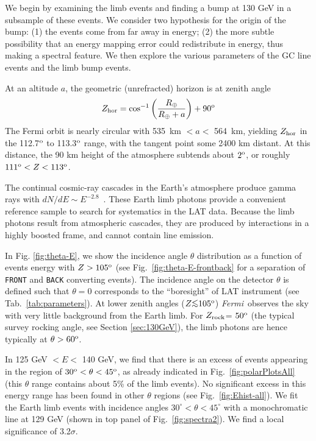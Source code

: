 \documentclass[aps,twocolumn,prd,superscriptaddress,showpacs,nofootinbib,fixfloat]{revtex4}
\newcommand{\be}{\begin{equation}}
\newcommand{\ee}{\end{equation}}
\newcommand{\Fermi}{{\slshape Fermi}}
\newcommand{\degree}{^{\rm o}}
\newcommand{\zrock}{$Z_{\rm rock}$}
\def\la{\vcenter{\hbox{$<$}\offinterlineskip\hbox{$\sim$}}}
\newcommand\Refsec[1]{Section \ref{sec:#1}}
\begin{document}
We begin by examining the limb events and finding a bump at
130 GeV in a subsample of these events.  We consider two
hypothesis for the origin of the bump: (1) the events come
from far away in energy; (2) the more subtle possibility
that an energy mapping error could redistribute in energy,
thus making a spectral feature. We then explore the various
parameters of the GC line events and the limb bump events.

At an altitude $a$, the geometric (unrefracted) horizon is
at zenith angle \be Z_{\rm hor} =
\cos^{-1}\left(\frac{R_\oplus}{R_\oplus+a}\right)+90\degree
\ee The Fermi orbit is nearly circular with 535~km $< a <$
564~km, yielding $Z_{\rm hor}$ in the 112.7$\degree$ to
113.3$\degree$ range, with the tangent point some 2400 km
distant.  At this distance, the 90 km height of the
atmosphere subtends about $2\degree$, or roughly $111\degree
< Z < 113\degree$.

The continual cosmic-ray cascades in the Earth's atmosphere
produce gamma rays with $dN/dE \sim
E^{-2.8}$~\citep{FermiLimb}. These Earth limb photons
provide a convenient reference sample to search for
systematics in the LAT data.  Because the limb photons
result from atmospheric cascades, they are produced by
interactions in a highly boosted frame, and cannot contain
line emission.  

In Fig. \ref{fig:theta-E}, we show the incidence angle
$\theta$ distribution as a function of events energy with $Z
> 105\degree$ (see Fig.~\ref{fig:theta-E-frontback} for a
separation of \texttt{FRONT} and \texttt{BACK} converting
events).  The incidence angle on the detector $\theta$ is
defined such that $\theta=0$ corresponds to the
``boresight'' of LAT instrument (see
Tab.~\ref{tab:parameters}).  At lower zenith angles ($Z \la
105\degree$) \Fermi\ observes the sky with very little
background from the Earth limb.  For \zrock = $50\degree$
(the typical survey rocking angle, see \Refsec{130GeV}), the
limb photons are hence typically at $\theta > 60\degree$.

In 125 GeV $< E <$ 140 GeV, we find that there is an excess
of events appearing in the region of $30\degree < \theta <
45\degree$, as already indicated in
Fig.~\ref{fig:polarPlotsAll} (this $\theta$ range contains
about 5\% of the limb events). No significant excess in this
energy range has been found in other $\theta$ regions (see
Fig.~\ref{fig:Ehist-all}). We fit the Earth limb events with
incidence angles $30^\circ<\theta<45^\circ$ with a
monochromatic line at 129 GeV (shown in top panel of
Fig.~\ref{fig:spectra2}). We find a local significance of
3.2$\sigma$.
\end{document}
